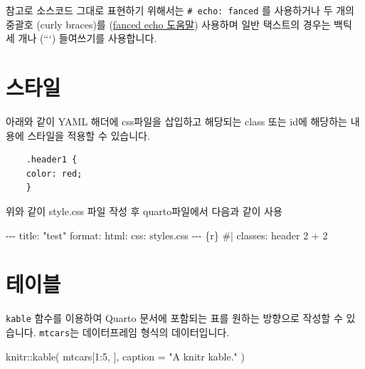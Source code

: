 \documentclass[
  a4paper,
]{book}
\newenvironment{Shaded}{\begin{snugshade}}{\end{snugshade}}
\newcommand{\AttributeTok}[1]{\textcolor[rgb]{0.40,0.45,0.13}{#1}}
\newcommand{\DecValTok}[1]{\textcolor[rgb]{0.68,0.00,0.00}{#1}}
\newcommand{\FunctionTok}[1]{\textcolor[rgb]{0.28,0.35,0.67}{#1}}
\newcommand{\InformationTok}[1]{\textcolor[rgb]{0.37,0.37,0.37}{#1}}
\newcommand{\NormalTok}[1]{\textcolor[rgb]{0.00,0.23,0.31}{#1}}
\newcommand{\SpecialCharTok}[1]{\textcolor[rgb]{0.37,0.37,0.37}{#1}}
\newcommand{\StringTok}[1]{\textcolor[rgb]{0.13,0.47,0.30}{#1}}
\begin{document}
참고로 소스코드 그대로 표현하기 위해서는
\texttt{\#\textbar{}\ echo:\ fanced} 를 사용하거나 두 개의 중괄호 (curly
braces)를
(\href{https://quarto.org/docs/computations/execution-options.html\#fenced-echo}{fanced
echo 도움말}) 사용하며 일반 택스트의 경우는 백틱 세 개나 (```)
들여쓰기를 사용합니다.

\hypertarget{uxc2a4uxd0c0uxc77c}{%
\section{스타일}\label{uxc2a4uxd0c0uxc77c}}

아래와 같이 YAML 해더에 css파일을 삽입하고 해당되는 class 또는 id에
해당하는 내용에 스타일을 적용할 수 있습니다.

\begin{verbatim}
    .header1 {
    color: red;
    }
\end{verbatim}

위와 같이 style.css 파일 작성 후 quarto파일에서 다음과 같이 사용

\begin{Shaded}
\begin{Highlighting}[]
\InformationTok{    {-}{-}{-}}
\InformationTok{    title: "test"}
\InformationTok{    format:}
\InformationTok{      html:}
\InformationTok{        css: styles.css}
\InformationTok{    {-}{-}{-}}
\InformationTok{    }
\InformationTok{    \textasciigrave{}\textasciigrave{}\textasciigrave{}\{r\}}
\InformationTok{    \#| classes: header}
\InformationTok{    }
\InformationTok{    2 + 2}
\InformationTok{    \textasciigrave{}\textasciigrave{}\textasciigrave{}}
\end{Highlighting}
\end{Shaded}

\hypertarget{uxd14cuxc774uxbe14}{%
\section{테이블}\label{uxd14cuxc774uxbe14}}

\texttt{kable} 함수를 이용하여 Quarto 문서에 포함되는 표를 원하는
방향으로 작성할 수 있습니다. \texttt{mtcars}는 데이터프레임 형식의
데이터입니다.

\begin{Shaded}
\begin{Highlighting}[]
\NormalTok{knitr}\SpecialCharTok{::}\FunctionTok{kable}\NormalTok{(}
\NormalTok{  mtcars[}\DecValTok{1}\SpecialCharTok{:}\DecValTok{5}\NormalTok{, ], }
  \AttributeTok{caption =} \StringTok{"A knitr kable."}
\NormalTok{)}
\end{Highlighting}
\end{Shaded}
\end{document}
